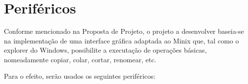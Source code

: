\documentclass[a4paper]{article}
\begin{document}
%
%
%
%
%
%
%

\section{Periféricos}



Conforme mencionado na Proposta de Projeto, o projeto a desenvolver baseia-se na implementação de uma interface gráfica adaptada ao Minix que, tal como o explorer do Windows, possibilite a executação de operações básicas, nomeadamente copiar, colar, cortar, renomear, etc.

Para o efeito, serão usados os seguintes periféricos:
  
\end{document}
